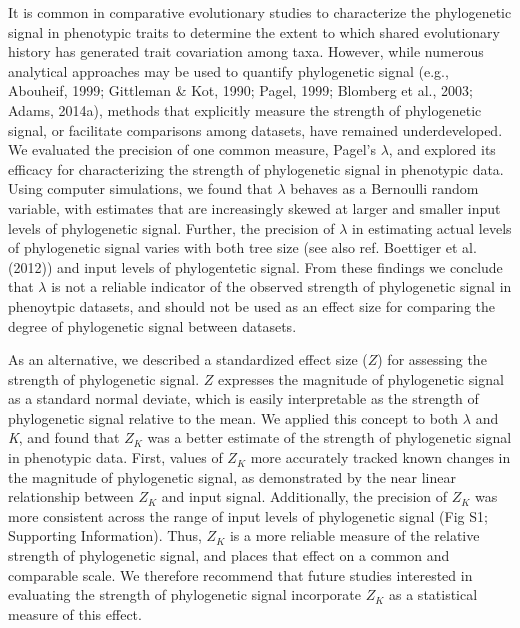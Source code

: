 \documentclass[
]{article}
\begin{document}
It is common in comparative evolutionary studies to characterize the
phylogenetic signal in phenotypic traits to determine the extent to
which shared evolutionary history has generated trait covariation among
taxa. However, while numerous analytical approaches may be used to
quantify phylogenetic signal (e.g., Abouheif, 1999; Gittleman \& Kot,
1990; Pagel, 1999; Blomberg et al., 2003; Adams, 2014a), methods that
explicitly measure the strength of phylogenetic signal, or facilitate
comparisons among datasets, have remained underdeveloped. We evaluated
the precision of one common measure, Pagel's \(\lambda\), and explored
its efficacy for characterizing the strength of phylogenetic signal in
phenotypic data. Using computer simulations, we found that \(\lambda\)
behaves as a Bernoulli random variable, with estimates that are
increasingly skewed at larger and smaller input levels of phylogenetic
signal. Further, the precision of \(\lambda\) in estimating actual
levels of phylogenetic signal varies with both tree size (see also ref.
Boettiger et al. (2012)) and input levels of phylogentetic signal. From
these findings we conclude that \(\lambda\) is not a reliable indicator
of the observed strength of phylogenetic signal in phenoytpic datasets,
and should not be used as an effect size for comparing the degree of
phylogenetic signal between datasets. \hfill\break

As an alternative, we described a standardized effect size (\(Z\)) for
assessing the strength of phylogenetic signal. \(Z\) expresses the
magnitude of phylogenetic signal as a standard normal deviate, which is
easily interpretable as the strength of phylogenetic signal relative to
the mean. We applied this concept to both \(\lambda\) and \emph{K}, and
found that \(Z_K\) was a better estimate of the strength of phylogenetic
signal in phenotypic data. First, values of \(Z_K\) more accurately
tracked known changes in the magnitude of phylogenetic signal, as
demonstrated by the near linear relationship between \(Z_K\) and input
signal. Additionally, the precision of \(Z_K\) was more consistent
across the range of input levels of phylogenetic signal (Fig S1;
Supporting Information). Thus, \(Z_K\) is a more reliable measure of the
relative strength of phylogenetic signal, and places that effect on a
common and comparable scale. We therefore recommend that future studies
interested in evaluating the strength of phylogenetic signal incorporate
\(Z_K\) as a statistical measure of this effect. \hfill\break
\end{document}
